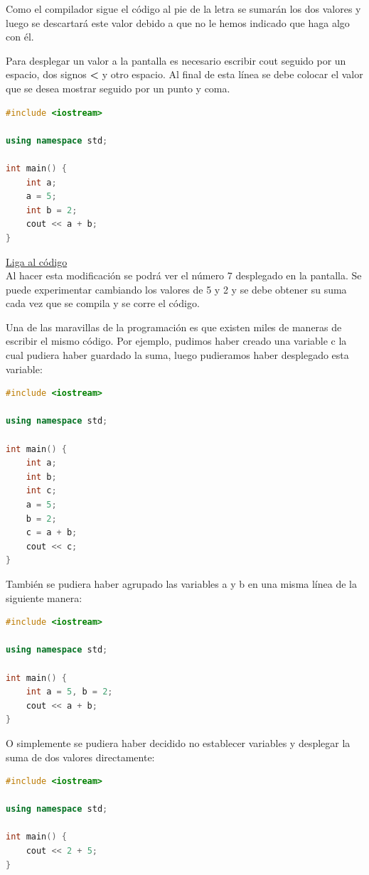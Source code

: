 \documentclass{article}
\begin{document}
Como el compilador sigue el código al pie de la letra se sumarán los dos valores y luego se descartará este valor debido a que no le hemos indicado que haga algo con él.

Para desplegar un valor a la pantalla es necesario escribir cout seguido por un espacio, dos signos \textbf{<} y otro espacio. Al final de esta línea se debe colocar el valor que se desea mostrar seguido por un punto y coma.

\begin{lstlisting}[language=C++, caption=Tu primer programa]
#include <iostream>

using namespace std;

int main() {
    int a;
    a = 5;
    int b = 2;
    cout << a + b;
}
\end{lstlisting}
\href{https://repl.it/@Jamesscn/Mi-primer-programa}{Liga al código}\\

Al hacer esta modificación se podrá ver el número 7 desplegado en la pantalla. Se puede experimentar cambiando los valores de 5 y 2 y se debe obtener su suma cada vez que se compila y se corre el código.

Una de las maravillas de la programación es que existen miles de maneras de escribir el mismo código. Por ejemplo, pudimos haber creado una variable c la cual pudiera haber guardado la suma, luego pudieramos haber desplegado esta variable:

\begin{lstlisting}[language=C++, caption=¿El mismo programa?]
#include <iostream>

using namespace std;

int main() {
	int a;
	int b;
	int c;
	a = 5;
	b = 2;
	c = a + b;
	cout << c;
}
\end{lstlisting}

También se pudiera haber agrupado las variables a y b en una misma línea de la siguiente manera:

\begin{lstlisting}[language=C++, caption=¿El mismo programa?]
#include <iostream>

using namespace std;

int main() {
    int a = 5, b = 2;
    cout << a + b;
}
\end{lstlisting}

O simplemente se pudiera haber decidido no establecer variables y desplegar la suma de dos valores directamente:

\begin{lstlisting}[language=C++, caption=¿El mismo programa?]
#include <iostream>

using namespace std;

int main() {
    cout << 2 + 5;
}
\end{lstlisting}
\end{document}

